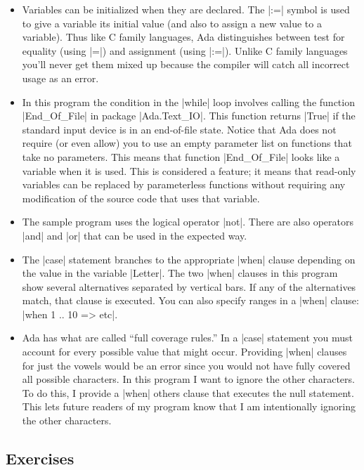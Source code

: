 \begin{itemize}
\item Variables can be initialized when they are declared. The |:=| symbol is used to give a
  variable its initial value (and also to assign a new value to a variable). Thus like C family
  languages, Ada distinguishes between test for equality (using |=|) and assignment (using
  |:=|). Unlike C family languages you'll never get them mixed up because the compiler will
  catch all incorrect usage as an error.

\item In this program the condition in the |while| loop involves calling the function
  |End_Of_File| in package |Ada.Text_IO|. This function returns |True| if the standard input
  device is in an end-of-file state. Notice that Ada does not require (or even allow) you to use
  an empty parameter list on functions that take no parameters. This means that function
  |End_Of_File| looks like a variable when it is used. This is considered a feature; it means
  that read-only variables can be replaced by parameterless functions without requiring any
  modification of the source code that uses that variable.

\item The sample program uses the logical operator |not|. There are also operators |and| and
  |or| that can be used in the expected way.

\item The |case| statement branches to the appropriate |when| clause depending on the value in
  the variable |Letter|. The two |when| clauses in this program show several alternatives
  separated by vertical bars. If any of the alternatives match, that clause is executed. You can
  also specify ranges in a |when| clause: |when 1 .. 10 => etc|.

\item Ada has what are called ``full coverage rules.'' In a |case| statement you must account
  for every possible value that might occur. Providing |when| clauses for just the vowels would
  be an error since you would not have fully covered all possible characters. In this program I
  want to ignore the other characters. To do this, I provide a |when| others clause that
  executes the null statement. This lets future readers of my program know that I am
  intentionally ignoring the other characters.
\end{itemize}

\subsection*{Exercises}

